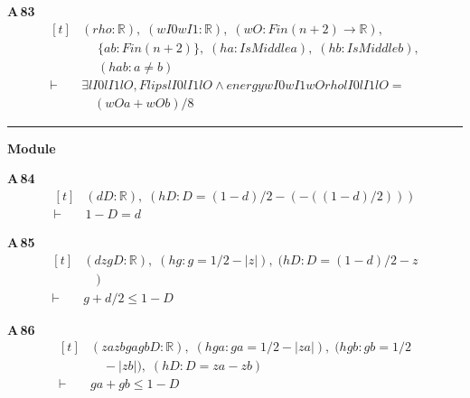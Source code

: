 \noindent\textbf{A\,83}\quad{}
{\footnotesize\[ \begin{aligned}[t]
&(\mathit{rho} : \mathbb{R} ),\; (\mathit{wI0} \mathit{wI1} : \mathbb{R} ),\; (\mathit{wO} : \mathit{Fin} (\mathit{n}+2) \to \mathbb{R} ),\\
&\quad \; \{ \mathit{a} \mathit{b} : \mathit{Fin} (\mathit{n}+2)\},\; (\mathit{ha} : \mathit{IsMiddle} \mathit{a}),\; (\mathit{hb} : \mathit{IsMiddle} \mathit{b}),\\
&\quad \; (\mathit{hab} : \mathit{a} \neq \mathit{b})\\
\vdash\;&\exists \mathit{lI0} \mathit{lI1} \mathit{lO}, \mathit{Flips} \mathit{lI0} \mathit{lI1} \mathit{lO} \wedge \mathit{energy} \mathit{wI0} \mathit{wI1} \mathit{wO} \mathit{rho} \mathit{lI0} \mathit{lI1} \mathit{lO} =\\
&\quad (\mathit{wO} \mathit{a} + \mathit{wO} \mathit{b})/8
\end{aligned} \]}

\vspace{4pt}\noindent\rule{\columnwidth}{0.4pt}\par\vspace{2pt}
\noindent\textbf{Module }\par\vspace{3pt}

\noindent\textbf{A\,84}\quad{}
{\footnotesize\[ \begin{aligned}[t]
&(\mathit{d} \mathit{D} : \mathbb{R} ),\; (\mathit{hD} : \mathit{D} = (1 - \mathit{d})/2 - (-((1 - \mathit{d})/2)))\\
\vdash\;&1 - \mathit{D} = \mathit{d}
\end{aligned} \]}

\noindent\textbf{A\,85}\quad{}
{\footnotesize\[ \begin{aligned}[t]
&(\mathit{d} \mathit{z} \mathit{g} \mathit{D} : \mathbb{R} ),\; (\mathit{hg} : \mathit{g} = 1/2 - |\mathit{z}|),\; (\mathit{hD} : \mathit{D} = (1 - \mathit{d})/2 - \mathit{z}\\
&\quad )\\
\vdash\;&\mathit{g} + \mathit{d}/2 \leq 1 - \mathit{D}
\end{aligned} \]}

\noindent\textbf{A\,86}\quad{}
{\footnotesize\[ \begin{aligned}[t]
&(\mathit{za} \mathit{zb} \mathit{ga} \mathit{gb} \mathit{D} : \mathbb{R} ),\; (\mathit{hga} : \mathit{ga} = 1/2 - |\mathit{za}|),\; (\mathit{hgb} : \mathit{gb} = 1/2\\
&\quad - |\mathit{zb}|),\; (\mathit{hD} : \mathit{D} = \mathit{za} - \mathit{zb})\\
\vdash\;&\mathit{ga} + \mathit{gb} \leq 1 - \mathit{D}
\end{aligned} \]}

